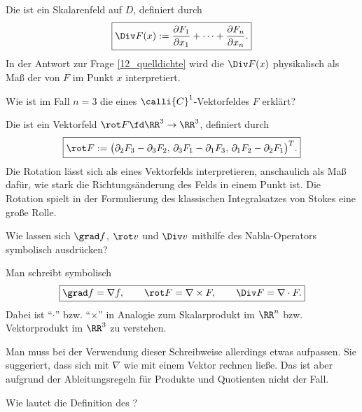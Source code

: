 \begin{antwort}
  Die  ist ein Skalarenfeld auf $D$, definiert 
  durch
  \[\boxed{
    \Div F(x) := \frac{\partial F_1}{\partial x_1} + 
    \cdots + \frac{\partial F_n}{\partial x_n}.
  }
  \]
  In der Antwort zur Frage \ref{12_quelldichte}
  wird die $\Div F(x)$  
  physikalisch als Maß der  von $F$ im Punkt $x$ 
  interpretiert. \AntEnd 
\end{antwort}

\begin{frage}
  Wie ist im Fall $n=3$ die  eines 
  $\calli{C}^1$-Vektorfeldes $F$ erklärt?
\end{frage}

\begin{antwort}
  Die  ist ein Vektorfeld 
  $\rot F \fd \RR^3\to\RR^3$, 
  definiert durch 
  \[
  \boxed{
    \rot F :=\big( 
    \partial_2F_3-\partial_3 F_2,\, 
    \partial_3F_1-\partial_1 F_3,\,
    \partial_1F_2-\partial_2 F_1 
    \big)^T.
  }
  \]
  Die Rotation lässt sich als  eines Vektorfelds 
  interpretieren, anschaulich als Maß dafür, wie stark die 
  Richtungsänderung des Felds in einem Punkt ist. 
  Die Rotation spielt in der Formulierung 
  des klassischen Integralsatzes von Stokes eine große Rolle.
\end{antwort} 

\begin{frage}
  Wie lassen sich $\grad f$, $\rot v$ und $\Div v$ mithilfe des 
  Nabla-Operators symbolisch ausdrücken?
\end{frage}

\begin{antwort}
  Man schreibt symbolisch 
  \[
  \boxed{
    \grad f = \nabla f, \qquad 
    \rot F  = \nabla \times F, \qquad 
    \Div F = \nabla \cdot F.}
  \]
  Dabei ist "`$\cdot$"' bzw. "`$\times$"' in Analogie zum 
  Skalarprodukt im $\RR^n$ bzw. Vektorprodukt im $\RR^3$ zu verstehen. 

  Man muss bei der Verwendung dieser Schreibweise allerdings etwas aufpassen. 
  Sie suggeriert, dass sich mit $\nabla$ wie mit einem Vektor rechnen ließe. 
  Das ist aber aufgrund der Ableitungsregeln für Produkte und Quotienten 
  nicht der Fall. 
  \AntEnd
\end{antwort} 

\begin{frage}
  Wie lautet die Definition des ? 
\end{frage}

